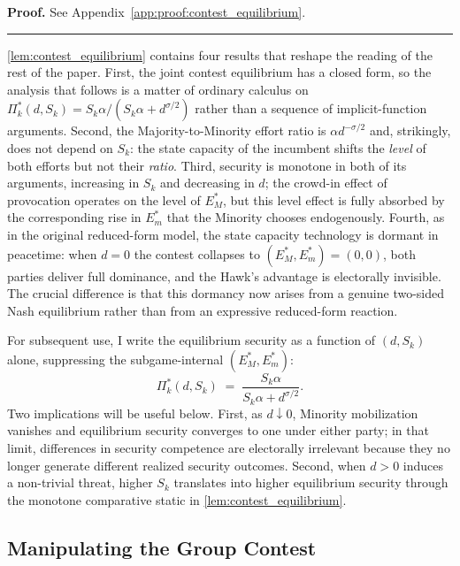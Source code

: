 \documentclass[11pt,twoside]{extarticle}
\newenvironment{proof}[1][Proof]{\noindent \textbf{#1.} }{\ \rule{0.5em}{0.5em}}
\begin{document}
\begin{proof}
See Appendix~\autoref{app:proof:contest_equilibrium}.
\end{proof}

\autoref{lem:contest_equilibrium} contains four results that reshape the reading of the rest of the paper. First, the joint contest equilibrium has a closed form, so the analysis that follows is a matter of ordinary calculus on $\Pi_k^*(d,S_k)=S_k\alpha/(S_k\alpha+d^{\sigma/2})$ rather than a sequence of implicit-function arguments. Second, the Majority-to-Minority effort ratio is $\alpha d^{-\sigma/2}$ and, strikingly, does not depend on $S_k$: the state capacity of the incumbent shifts the \emph{level} of both efforts but not their \emph{ratio}. Third, security is monotone in both of its arguments, increasing in $S_k$ and decreasing in $d$; the crowd-in effect of provocation operates on the level of $E_M^*$, but this level effect is fully absorbed by the corresponding rise in $E_m^*$ that the Minority chooses endogenously. Fourth, as in the original reduced-form model, the state capacity technology is dormant in peacetime: when $d=0$ the contest collapses to $(E_M^*,E_m^*)=(0,0)$, both parties deliver full dominance, and the Hawk's advantage is electorally invisible. The crucial difference is that this dormancy now arises from a genuine two-sided Nash equilibrium rather than from an expressive reduced-form reaction.

For subsequent use, I write the equilibrium security as a function of $(d,S_k)$ alone, suppressing the subgame-internal $(E_M^*,E_m^*)$:
\begin{equation} \label{eq:Pi_star_d}
\Pi_k^*(d,S_k)\;=\;\frac{S_k\alpha}{S_k\alpha+d^{\sigma/2}}.
\end{equation}
Two implications will be useful below. First, as $d\downarrow 0$, Minority mobilization vanishes and equilibrium security converges to one under either party; in that limit, differences in security competence are electorally irrelevant because they no longer generate different realized security outcomes. Second, when $d>0$ induces a non-trivial threat, higher $S_k$ translates into higher equilibrium security through the monotone comparative static in \autoref{lem:contest_equilibrium}.

\subsection{Manipulating the Group Contest} \label{subsec:contest_theory}
\end{document}
